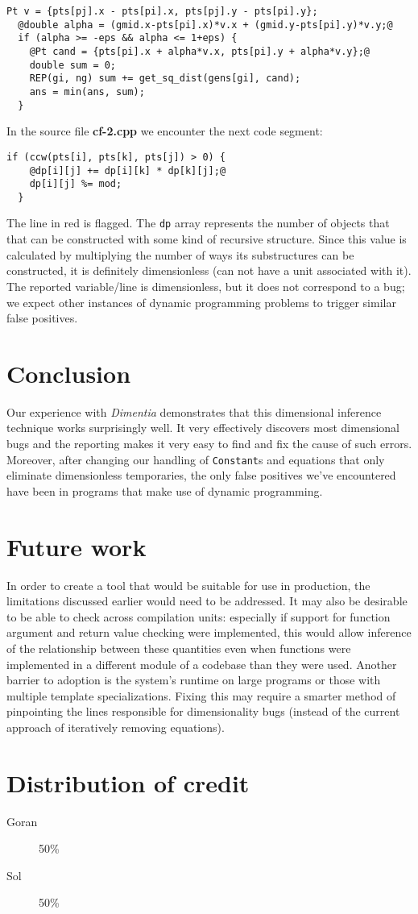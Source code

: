 \documentclass[12pt]{article}
\begin{document}
\begin{lstlisting}[label=proposal-full.cpp]
  Pt v = {pts[pj].x - pts[pi].x, pts[pj].y - pts[pi].y};
  @double alpha = (gmid.x-pts[pi].x)*v.x + (gmid.y-pts[pi].y)*v.y;@
  if (alpha >= -eps && alpha <= 1+eps) {
    @Pt cand = {pts[pi].x + alpha*v.x, pts[pi].y + alpha*v.y};@
    double sum = 0;
    REP(gi, ng) sum += get_sq_dist(gens[gi], cand);
    ans = min(ans, sum);
  }  
\end{lstlisting}

In the source file \textbf{cf-2.cpp} we encounter the next code segment:
\begin{lstlisting}[label=cf-2.cpp]
  if (ccw(pts[i], pts[k], pts[j]) > 0) {
    @dp[i][j] += dp[i][k] * dp[k][j];@
    dp[i][j] %= mod;
  }
\end{lstlisting}
The line in red is flagged.
The \texttt{dp} array represents the number of objects that that can be constructed with some kind of recursive structure.
Since this value is calculated by multiplying the number of ways its substructures can be constructed, it is definitely dimensionless (can not have a unit associated with it).
The reported variable/line is dimensionless, but it does not correspond to a bug; we expect other instances of dynamic programming problems to trigger similar false positives.

\section{Conclusion}

Our experience with \textit{Dimentia} demonstrates that this dimensional inference technique works surprisingly well.
It very effectively discovers most dimensional bugs and the reporting makes it very easy to find and fix the cause of such errors.
Moreover, after changing our handling of \texttt{Constant}s and equations that only eliminate dimensionless temporaries, the only false positives we've encountered have been in programs that make use of dynamic programming.

\section{Future work}

In order to create a tool that would be suitable for use in production, the limitations discussed earlier would need to be addressed.
It may also be desirable to be able to check across compilation units: especially if support for function argument and return value checking were implemented, this would allow inference of the relationship between these quantities even when functions were implemented in a different module of a codebase than they were used.
Another barrier to adoption is the system's runtime on large programs or those with multiple template specializations.
Fixing this may require a smarter method of pinpointing the lines responsible for dimensionality bugs (instead of the current approach of iteratively removing equations).

\section{Distribution of credit}
\begin{description}
  \item[Goran] 50\%
    \item[Sol] 50\%
\end{description}



\end{document}
